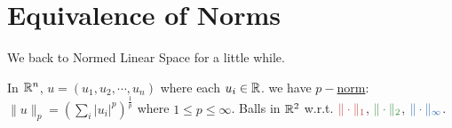 \chapter{Equivalence of Norms}
We back to Normed Linear Space for a little while.

In $\mathbb{R}^n$, $u=(u_1,u_2,\cdots,u_n)$ where each $u_i\in \mathbb{R}$. we have \hyperref[norm]{$p-$norm}: $\|u\|_p=\left(\sum\limits_i|u_i|^p\right)^{\frac1p}$ where $1\leq p\leq \infty$. Balls in $\mathbb{R}^2$ w.r.t. $\textcolor{myr}{\norm_1}$, $\textcolor{myg}{\norm_2}$, $\textcolor{myb}{\inorm}$.

\begin{center}
\end{center}


